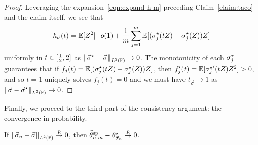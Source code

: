 \begin{proof}
	Leveraging the expansion~\eqref{eqn:expand-h-m} preceding
	Claim~\ref{claim:taco} and the claim itself, we see that
	\begin{equation*}
		h_{\vec{\sigma}}(t) = \mathbb{E}[Z^2] \cdot o(1) +
		\frac{1}{m} \sum_{j = 1}^m
		\mathbb{E}[(\sigma_j^\star(tZ) - \sigma_j^\star(Z))Z]
	\end{equation*}
	uniformly in $t \in [\frac{1}{2}, 2]$ as $\left\|{\vec{\sigma}^\star -
		\vec{\sigma}}\right\|_{L^2(\mathbb{P})} \to 0$. The monotonicity of each $\sigma_j^\star$ guarantees
	that if $f_j(t) = \mathbb{E}[(\sigma_j^\star(tZ) - \sigma_j^\star(Z))Z]$, then
	$f'_j(t) = \mathbb{E}[{\sigma_j^\star}'(tZ) Z^2] > 0$, and so $t = 1$ uniquely
	solves $f_j(t) = 0$ and we must have $t_{\vec{\sigma}} \to 1$ as
	$\left\|{\vec{\sigma} - \vec{\sigma}^\star}\right\|_{L^2(\mathbb{P})} \to 0$.
\end{proof}

Finally, we proceed to the third part of the consistency argument:
the convergence in probability.
\begin{lemma}
	\label{lemma:vec-sigma-probability}
	If $\left\|{\vec{\sigma}_n - \vec{\sigma}}\right\|_{L^2(\mathbb{P})} \stackrel{p}{\rightarrow} 0$,
	then $\widehat{\theta}^{\textup{sp}}_{n,m} - \theta_{\vec{\sigma}_n}^\star \stackrel{p}{\rightarrow} 0$.
\end{lemma}
